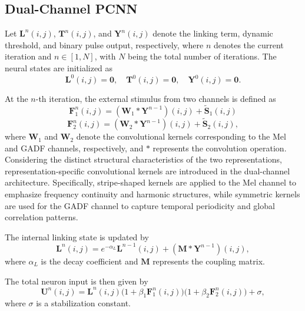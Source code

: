 \documentclass[journal]{IEEEtran}
\begin{document}
\subsection{Dual-Channel PCNN}
Let $\boldsymbol{L}^n(i,j)$, $\boldsymbol{T}^n(i,j)$, and $\boldsymbol{Y}^n(i,j)$ denote the linking term, dynamic threshold, and binary pulse output, respectively, where $n$ denotes the current iteration and $n \in [1, N]$, with $N$ being the total number of iterations. The neural states are initialized as
\begin{equation}
	\boldsymbol{L}^0(i,j) = \boldsymbol {0}, \quad 
	\boldsymbol{T}^0(i,j) = \boldsymbol {0}, \quad 
	\boldsymbol{Y}^0(i,j) = \boldsymbol {0}.
	\label{eq:initialization}
\end{equation}

At the $n$-th iteration, the external stimulus from two channels is defined as
\begin{equation}
	\boldsymbol{F}_1^n(i,j) = (\boldsymbol{W}_1 * \boldsymbol{Y}^{n-1})(i,j) + \boldsymbol{\tilde{S}}_1(i,j)
	\label{eq:f1_update}
\end{equation}
\begin{equation}
	\boldsymbol{F}_2^n(i,j) = (\boldsymbol{W}_2 * \boldsymbol{Y}^{n-1})(i,j) + \boldsymbol{\tilde{S}}_2(i,j),
	\label{eq:f2_update}
\end{equation}
where $\boldsymbol{W}_1$ and $\boldsymbol{W}_2$ denote the convolutional kernels corresponding to the Mel and GADF channels, respectively, and $*$ represents the convolution operation. Considering the distinct structural characteristics of the two representations, representation-specific convolutional kernels are introduced in the dual-channel architecture. Specifically, stripe-shaped kernels are applied to the Mel channel to emphasize frequency continuity and harmonic structures, while symmetric kernels are used for the GADF channel to capture temporal periodicity and global correlation patterns.

The internal linking state is updated by
\begin{equation}
	\boldsymbol{L}^n(i,j) = e^{-\alpha_L} \boldsymbol{L}^{n-1}(i,j) + (\boldsymbol{M} * \boldsymbol{Y}^{n-1})(i,j),
	\label{eq:linking_update}
\end{equation}
where $\alpha_L$ is the decay coefficient and $\boldsymbol M$ represents the coupling matrix.

The total neuron input is then given by
\begin{equation}
	\boldsymbol{U}^n(i,j) = \boldsymbol{L}^n(i,j)\Big(1 + \beta_1 \boldsymbol{F}_1^n(i,j)\Big)
	\Big(1 + \beta_2 \boldsymbol{F}_2^n(i,j)\Big) + \sigma,
	\label{eq:internal_activity}
\end{equation}
where $\sigma$ is a stabilization constant.
\end{document}

